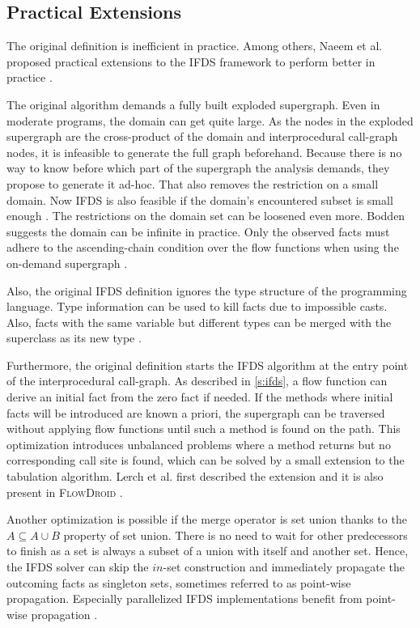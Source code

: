 \documentclass[../draft.tex]{subfiles}
\begin{document}
  
    \subsection{Practical Extensions}\label{s:ifdspractical}
    The original definition is inefficient in practice. 
    Among others, Naeem et al. proposed practical extensions to the IFDS framework to perform better in practice \cite{Naeem2010}.

    The original algorithm demands a fully built exploded supergraph.
    Even in moderate programs, the domain can get quite large. 
    As the nodes in the exploded supergraph are the cross-product of the domain and interprocedural call-graph nodes, it is infeasible to generate the full graph beforehand. 
    Because there is no way to know before which part of the supergraph the analysis demands, they propose to generate it ad-hoc. 
    That also removes the restriction on a small domain. 
    Now IFDS is also feasible if the domain's encountered subset is small enough \cite{Naeem2010}.
    The restrictions on the domain set can be loosened even more. 
    Bodden suggests the domain can be infinite in practice. 
    Only the observed facts must adhere to the ascending-chain condition over the flow functions when using the on-demand supergraph \cite{Bodden2012}.
    
    Also, the original IFDS definition ignores the type structure of the programming language. 
    Type information can be used to kill facts due to impossible casts. 
    Also, facts with the same variable but different types can be merged with the superclass as its new type \cite{Naeem2010}.

    Furthermore, the original definition starts the IFDS algorithm at the entry point of the interprocedural call-graph. 
    As described in \autoref{s:ifds}, a flow function can derive an initial fact from the zero fact if needed. 
    If the methods where initial facts will be introduced are known a priori, the supergraph can be traversed without applying flow functions until such a method is found on the path. 
    This optimization introduces unbalanced problems where a method returns but no corresponding call site is found, which can be solved by a small extension to the tabulation algorithm. 
    Lerch et al. first described the extension \cite{Lerch2015} and it is also present in \textsc{FlowDroid} \cite{Arzt2017PhD}.

    Another optimization is possible if the merge operator is set union thanks to the $A \subseteq A \cup B$ property of set union. 
    There is no need to wait for other predecessors to finish as a set is always a subset of a union with itself and another set.
    Hence, the IFDS solver can skip the $in$-set construction and immediately propagate the outcoming facts as singleton sets, sometimes referred to as point-wise propagation. 
    Especially parallelized IFDS implementations benefit from point-wise propagation \cite{Rodriguez2011}.
\end{document}
